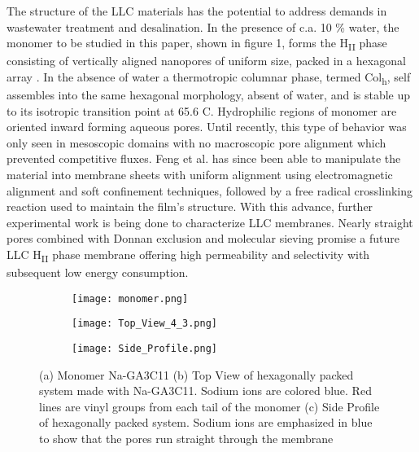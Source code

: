 \documentclass[12pt]{article}
\begin{document}
The structure of the LLC materials has the potential to address demands in wastewater treatment and desalination. In the presence of c.a. 10 \% water, the monomer to be studied in this paper, shown in figure 1, forms the H\textsubscript{II} phase consisting of vertically aligned nanopores of uniform size, packed in a hexagonal array \cite{smith_ordered_1997,resel_structural_2000}. In the absence of water a thermotropic columnar phase, termed Col\textsubscript{h}, self assembles into the same hexagonal morphology, absent of water, and is stable up to its isotropic transition point at 65.6 \degree C. Hydrophilic regions of monomer are oriented inward forming aqueous pores. Until recently, this type of behavior was only seen in mesoscopic domains with no macroscopic pore alignment which prevented competitive fluxes\cite{zhou_supported_2005}. Feng et al. has since been able to manipulate the material into membrane sheets with uniform alignment using electromagnetic alignment and soft confinement techniques, followed by a free radical crosslinking reaction used to maintain the film’s structure\cite{feng_scalable_2014,feng_thin_2016}. With this advance, further experimental work is being done to characterize LLC membranes. Nearly straight pores combined with Donnan exclusion and molecular sieving promise a future LLC H\textsubscript{II} phase membrane offering high permeability and selectivity with subsequent low energy consumption.
\begin{figure}
\centering
	\begin{subfigure}{.3\textwidth}
		\centering
		\texttt{[image: monomer.png]}
		\label{fig:monomer}
		\caption{}
	\end{subfigure}
	\begin{subfigure}{.3\textwidth}
		\centering %
		\texttt{[image: Top\_View\_4\_3.png]}
		\label{fig:TopView}
		\caption{}
	\end{subfigure}
	\begin{subfigure}{.3\textwidth}
		\centering
		\texttt{[image: Side\_Profile.png]}
		\label{fig:SideProfile}
		\caption{}
	\end{subfigure}
	\caption{(a) Monomer Na-GA3C11 (b) Top View of hexagonally packed system made with Na-GA3C11. Sodium ions are colored blue. Red lines are vinyl groups from each tail of the monomer (c) Side Profile of hexagonally packed system. Sodium ions are emphasized in blue to show that the pores run straight through the membrane}
	\label{fig:System}
\end{figure}
\end{document}
